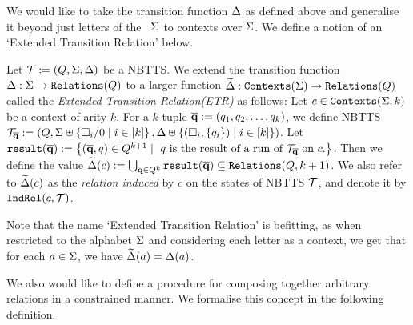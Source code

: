 We would like to take the transition function $\Delta$ as defined above and generalise it beyond just letters of the \rab\ $\Sigma$ to contexts over $\Sigma$. We define a notion of an `Extended Transition Relation' below.

\begin{definition}\label{def:extendedTransitionRelation}
    Let $\mathcal{T} := (Q, \Sigma, \Delta)$ be a NBTTS. We extend the transition function $\Delta : \Sigma \to \texttt{Relations}(Q)$ to a larger function $\widetilde{\Delta} : \texttt{Contexts}(\Sigma) \to \texttt{Relations}(Q)$ called the \emph{Extended Transition Relation(ETR)} as follows: Let $c \in \texttt{Contexts}(\Sigma, k)$ be a context of arity $k$. For a $k$-tuple $\overline{\textbf{q}} := (q_1, q_2, \dots, q_k)$, we define NBTTS $\mathcal{T}_{\overline{\textbf{q}}} := (Q, \Sigma \uplus \left\{ \square_i/0 \mid i \in [k] \right\}, \Delta \uplus \left\{ (\square_i, \left\{ q_i \right\}) \mid i \in [k] \right\})$. Let $\texttt{result}(\overline{\textbf{q}}) := \left\{ (\overline{\textbf{q}}, q) \in Q^{k+1} \mid \mbox{ $q$ is the result of a run of $\mathcal{T}_{\overline{\textbf{q}}}$ on $c$.} \right\}$. Then we define the value $\widetilde{\Delta}(c) := \bigcup_{\overline{\textbf{q}} \in Q^k} \texttt{result}(\overline{\textbf{q}}) \subseteq \texttt{Relations}(Q, k+1)$. We also refer to $\widetilde{\Delta}(c)$ as the \emph{relation induced} by $c$ on the states of NBTTS $\mathcal{T}$, and denote it by $\texttt{IndRel}(c, \mathcal{T})$.
\end{definition}

Note that the name `Extended Transition Relation' is befitting, as when restricted to the alphabet $\Sigma$ and considering each letter as a context, we get that for each $a \in \Sigma$, we have $\widetilde{\Delta}(a) = \Delta(a)$.


We also would like to define a procedure for composing together arbitrary relations in a constrained manner. We formalise this concept in the following definition.


